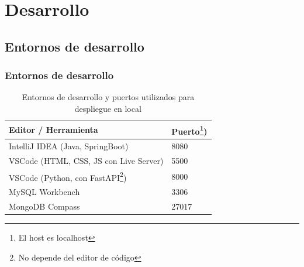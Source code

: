 \documentclass{beamer}
\begin{document}
		
		
		
		
		
		
		
	\section{Desarrollo}
	
	
	
	
	
		

	
	
	
	\subsection{Entornos de desarrollo}
	\begin{frame}
		\frametitle{Entornos de desarrollo}
					
		\begin{table}[h!]
			\centering
			\begin{tabular}{|l|l|}
				\hline
				\textbf{Editor / Herramienta} & \textbf{Puerto\footnote{El host es localhost})} \\
				\hline
				IntelliJ IDEA (Java, SpringBoot) & 8080 \\
				VSCode (HTML, CSS, JS con Live Server) & 5500 \\
				VSCode (Python, con FastAPI\footnote{No depende del editor de código}) & 8000 \\
				MySQL Workbench & 3306 \\
				MongoDB Compass & 27017 \\
				\hline
			\end{tabular}
			\caption{Entornos de desarrollo y puertos utilizados para despliegue en local}
		\end{table}
	\end{frame}
	
	
	
	
\end{document}
